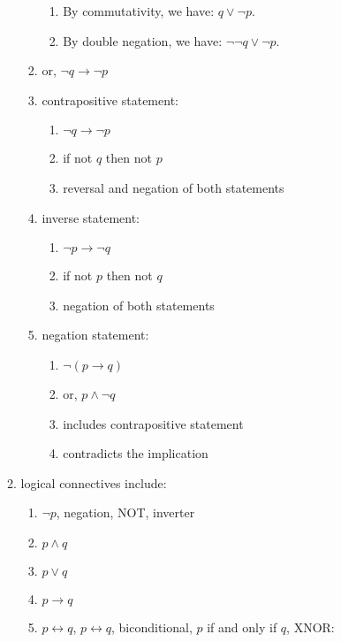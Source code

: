 \begin{enumerate}
\begin{enumerate}
\begin{enumerate}
			\begin{enumerate} \itemsep -1pt
			\item By commutativity, we have: $q \lor \neg p$.
			\item By double negation, we have: $\neg \neg q \lor \neg p$.
			\end{enumerate}
		\item or, $\neg q \rightarrow \neg p$
		\item contrapositive statement: \vspace{-0.1cm}
			\begin{enumerate} \itemsep -1pt
			\item $\neg q \longrightarrow \neg p$
			\item if not $q$ then not $p$
			\item reversal and negation of both statements
			\end{enumerate}
		\item inverse statement: \vspace{-0.1cm}
			\begin{enumerate} \itemsep -1pt
			\item $\neg p \longrightarrow \neg q$
			\item if not $p$ then not $q$
			\item negation of both statements
			\end{enumerate}
		\item negation statement: \vspace{-0.1cm}
			\begin{enumerate} \itemsep -1pt
			\item $\neg (p \longrightarrow q)$
			\item or, $p \land \neg q$
			\item includes contrapositive statement
			\item contradicts the implication
			\end{enumerate}
		\end{enumerate}
	\item logical connectives include: \vspace{-0.2cm}
		\begin{enumerate} \itemsep -2pt
		\item $\neg p$, negation, NOT, inverter
		\item $p \land q$
		\item $p \lor q$
		\item $p \rightarrow q$
		\item $p \leftrightarrow q$, $p \longleftrightarrow q$, biconditional, $p$ if and only if $q$, XNOR: \vspace{-0.1cm}

\end{enumerate}
\end{enumerate}
\end{enumerate}
